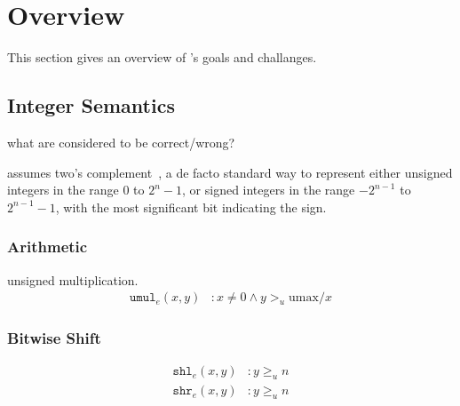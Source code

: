 \section{Overview}
\label{s:oview}

This section gives an overview of \sys's goals and challanges.

\subsection{Integer Semantics}

\newcommand{\smin}{\mathrm{smin}}
\newcommand{\smax}{\mathrm{smax}}
\newcommand{\umax}{\mathrm{umax}}

\newcommand{\sadde}{\mathtt{sadd}_e}
\newcommand{\uadde}{\mathtt{uadd}_e}
\newcommand{\ssube}{\mathtt{ssub}_e}
\newcommand{\usube}{\mathtt{usub}_e}
\newcommand{\smule}{\mathtt{smul}_e}
\newcommand{\umule}{\mathtt{umul}_e}
\newcommand{\sdive}{\mathtt{sdiv}_e}
\newcommand{\udive}{\mathtt{udiv}_e}
\newcommand{\shle}{\mathtt{shl}_e}
\newcommand{\shre}{\mathtt{shr}_e}
\newcommand{\conve}{\mathtt{conv}_e}


what are considered to be correct/wrong?

\sys assumes two's complement~\cite{intel:int}, a de facto
standard way to represent either unsigned integers in the range $0$
to $2^n-1$, or signed integers in the range $-2^{n-1}$ to $2^{n-1}-1$,
with the most significant bit indicating the sign.

\subsubsection*{Arithmetic}

unsigned multiplication.
\begin{align}
\umule(x, y)&: x \neq 0 \land y >_u \umax / x
\end{align}



\subsubsection*{Bitwise Shift}

\begin{align}
\shle(x, y)&: y \geq_u n \\
\shre(x, y)&: y \geq_u n
\end{align}

